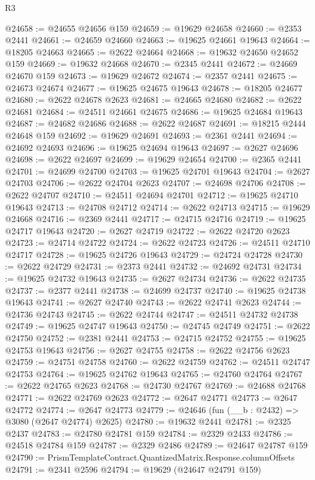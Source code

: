 \begin{lexlean}{R3}
\begin{coremodule}
@24658 := @24655 @24656 @159
@24659 := @19629 @24658
@24660 := @2353 @2441
@24661 := @24659 @24660
@24663 := @19625 @24661 @19643
@24664 := @18205 @24663
@24665 := @2622 @24664
@24668 := @19632 @24650 @24652 @159
@24669 := @19632 @24668
@24670 := @2345 @2441
@24672 := @24669 @24670 @159
@24673 := @19629 @24672
@24674 := @2357 @2441
@24675 := @24673 @24674
@24677 := @19625 @24675 @19643
@24678 := @18205 @24677
@24680 := @2622 @24678 @2623
@24681 := @24665 @24680
@24682 := @2622 @24681
@24684 := @24511 @24661 @24675
@24686 := @19625 @24684 @19643
@24687 := @24682 @24686
@24688 := @2622 @24687
@24691 := @18215 @2444 @24648 @159
@24692 := @19629 @24691
@24693 := @2361 @2441
@24694 := @24692 @24693
@24696 := @19625 @24694 @19643
@24697 := @2627 @24696
@24698 := @2622 @24697
@24699 := @19629 @24654
@24700 := @2365 @2441
@24701 := @24699 @24700
@24703 := @19625 @24701 @19643
@24704 := @2627 @24703
@24706 := @2622 @24704 @2623
@24707 := @24698 @24706
@24708 := @2622 @24707
@24710 := @24511 @24694 @24701
@24712 := @19625 @24710 @19643
@24713 := @24708 @24712
@24714 := @2622 @24713
@24715 := @19629 @24668
@24716 := @2369 @2441
@24717 := @24715 @24716
@24719 := @19625 @24717 @19643
@24720 := @2627 @24719
@24722 := @2622 @24720 @2623
@24723 := @24714 @24722
@24724 := @2622 @24723
@24726 := @24511 @24710 @24717
@24728 := @19625 @24726 @19643
@24729 := @24724 @24728
@24730 := @2622 @24729
@24731 := @2373 @2441
@24732 := @24692 @24731
@24734 := @19625 @24732 @19643
@24735 := @2627 @24734
@24736 := @2622 @24735
@24737 := @2377 @2441
@24738 := @24699 @24737
@24740 := @19625 @24738 @19643
@24741 := @2627 @24740
@24743 := @2622 @24741 @2623
@24744 := @24736 @24743
@24745 := @2622 @24744
@24747 := @24511 @24732 @24738
@24749 := @19625 @24747 @19643
@24750 := @24745 @24749
@24751 := @2622 @24750
@24752 := @2381 @2441
@24753 := @24715 @24752
@24755 := @19625 @24753 @19643
@24756 := @2627 @24755
@24758 := @2622 @24756 @2623
@24759 := @24751 @24758
@24760 := @2622 @24759
@24762 := @24511 @24747 @24753
@24764 := @19625 @24762 @19643
@24765 := @24760 @24764
@24767 := @2622 @24765 @2623
@24768 := @24730 @24767
@24769 := @24688 @24768
@24771 := @2622 @24769 @2623
@24772 := @2647 @24771
@24773 := @2647 @24772
@24774 := @2647 @24773
@24779 := @24646 (fun (__b : @2432) => @3080 (@2647 @24774) @2625)
@24780 := @19632 @2441
@24781 := @2325 @2437
@24783 := @24780 @24781 @159
@24784 := @2329 @2433
@24786 := @24518 @24784 @159
@24787 := @2329 @2486
@24789 := @24647 @24787 @159
@24790 := PrismTemplateContract.QuantizedMatrix.Response.columnOffsets
@24791 := @2341 @2596
@24794 := @19629 (@24647 @24791 @159)

\end{coremodule}
\end{lexlean}
